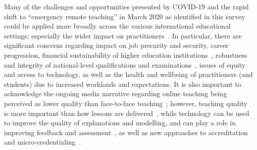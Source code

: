 \documentclass[conference]{IEEEtran}
\begin{document}
Many of the challenges and opportunities presented by COVID-19 and the
rapid shift to ``emergency remote teaching'' in March 2020 as
identified in this survey could be applied more broadly across the
various international educational settings; especially the wider
impact on
practitioners~\cite{mitteachinglabreport:2020,nasemcovid:2020,marchant-et-al:2020}. In
particular, there are significant concerns regarding impact on job
precarity and security, career progression, financial sustainability
of higher education institutions~\cite{watermeyer-et-al:he2020},
robustness and integrity of national-level qualifications and
examinations~\cite{dfeexams:2021}, issues of equity and access to
technology, as well as the health and wellbeing of practitioners (and
students) due to increased workloads and expectations. It is also
important to acknowledge the ongoing media narrative regarding online
teaching being perceived as lower quality than face-to-face
teaching~\cite{paechter+maier:ihe2010,scbbcnews:2020}; however,
teaching quality is more important than how lessons are
delivered~\cite{eefremote:2020}, while technology can be used to
improve the quality of explanations and modelling, and can play a role
in improving feedback and assessment~\cite{eefdigtech:2019}, as well
as new approaches to accreditation~\cite{crick-et-al:iticse2020,irons-et-alposter:sigcse2021} and
micro-credentialing~\cite{phillips-et-al:educon2021}.


\end{document}
